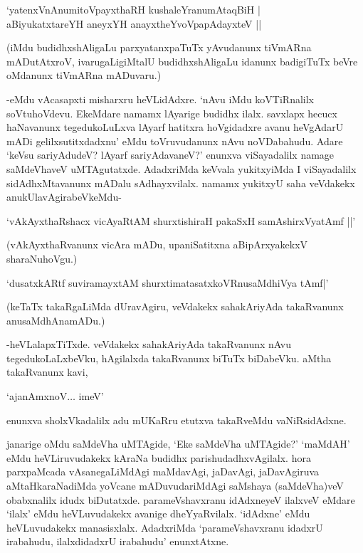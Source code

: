 \begin{shloka}
`yatenxVnAnumitoV\s payxthaRH kushaleYranumAtaqBiH |\\
aBiyukatxtareYH aneyxYH anayxtheYvoVpapAdayxteV ||
\end{shloka}

(iMdu budidhxshAligaLu parxyatanxpaTuTx yAvudanunx tiVmARna mADutAtxroV, ivarugaLigiMtalU budidhxshAligaLu idanunx badigiTuTx beVre oMdanunx tiVmARna mADuvaru.)

-eMdu vAcasapxti misharxru heVLidAdxre. `nAvu iMdu koVTiRnalilx soVtuhoVdevu. EkeMdare namamx lAyarige budidhx ilalx. savxlapx hecucx haNavanunx tegedukoLuLxva lAyarf hatitxra hoVgidadxre avanu heVgAdarU mADi gelilxsutitxdadxnu' eMdu toVruvudanunx nAvu noVDabahudu. Adare `keVsu sariyAdudeV? lAyarf sariyAdavaneV?' enunxva viSayadalilx namage saMdeVhaveV uMTAgutatxde. AdadxriMda keVvala yukitxyiMda I viSayadalilx sidAdhxMtavanunx mADalu sAdhayxvilalx. namamx yukitxyU saha veVdakekx anukUlavAgirabeVkeMdu-

\begin{shloka}
`vAkAyxthaRshacx vicAyaRtAM shurxtishiraH pakaSxH samAshirxVyatAmf ||'
\end{shloka}

(vAkAyxthaRvanunx vicAra mADu, upaniSatitxna aBipArxyakekxV sharaNuhoVgu.)

\begin{shloka}
`dusatxkARtf suviramayxtAM shurxtimatasatxkoVR\s nusaMdhiVya tAmf|'
\end{shloka}

(keTaTx takaRgaLiMda dUravAgiru, veVdakekx sahakAriyAda takaRvanunx anusaMdhAnamADu.)

-heVLalapxTiTxde. veVdakekx sahakAriyAda takaRvanunx nAvu tegedukoLaLxbeVku, hAgilalxda takaRvanunx biTuTx biDabeVku. aMtha takaRvanunx kavi,

\begin{shloka}
`ajanAmxnoV$\ldots$ imeV'
\end{shloka}

enunxva sholxVkadalilx adu mUKaRru etutxva takaRveMdu vaNiRsidAdxne.

janarige oMdu saMdeVha uMTAgide, `Eke saMdeVha uMTAgide?' `maMdAH' eMdu heVLiruvudakekx kAraNa budidhx parishudadhxvAgilalx. hora parxpaMcada vAsanegaLiMdAgi maMdavAgi, jaDavAgi, jaDavAgiruva aMtaHkaraNadiMda yoVcane mADuvudariMdAgi saMshaya (saMdeVha)veV obabxnalilx idudx biDutatxde. parameVshavxranu idAdxneyeV ilalxveV eMdare `ilalx' eMdu heVLuvudakekx avanige dheYyaRvilalx. `idAdxne' eMdu heVLuvudakekx manasisxlalx. AdadxriMda `parameVshavxranu idadxrU irabahudu, ilalxdidadxrU irabahudu' enunxtAtxne.

